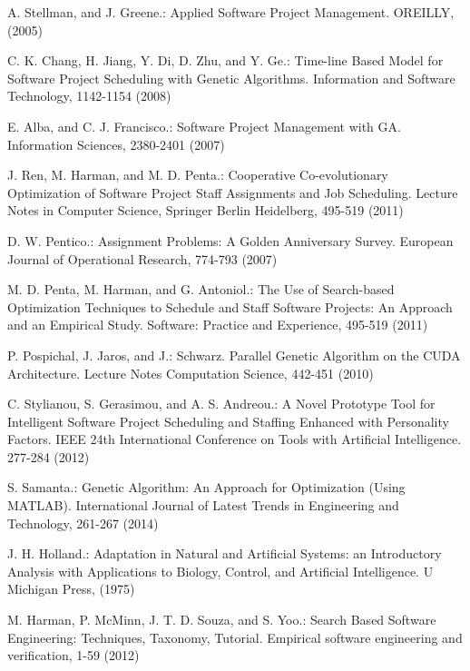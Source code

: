 %
%
\begin{thebibliography}{}
%
A. Stellman, and J. Greene.:
Applied Software Project Management.
OREILLY, (2005)

C. K. Chang, H. Jiang, Y. Di, D. Zhu, and Y. Ge.:
Time-line Based Model for Software Project 
Scheduling with Genetic Algorithms.
Information and Software Technology, 1142-1154 (2008)

E. Alba, and C. J. Francisco.:
Software Project Management with GA.
Information Sciences, 2380-2401 (2007)

J. Ren, M. Harman, and M. D. Penta.:
Cooperative Co-evolutionary Optimization of Software 
Project Staff Assignments and Job Scheduling.
Lecture Notes in Computer Science, Springer Berlin Heidelberg, 495-519 (2011)

D. W. Pentico.:
Assignment Problems: A Golden Anniversary Survey.
European Journal of Operational Research, 774-793 (2007)

M. D. Penta, M. Harman, and G. Antoniol.:
The Use of Search-based Optimization Techniques to 
Schedule and Staff Software Projects: An Approach and an Empirical Study. 
Software: Practice and Experience, 495-519 (2011)

P. Pospichal, J. Jaros, and J.:
Schwarz. Parallel Genetic Algorithm on the CUDA Architecture.
Lecture Notes Computation Science, 442-451 (2010)


C. Stylianou, S. Gerasimou, and A. S. Andreou.:
A Novel Prototype Tool for Intelligent Software 
Project Scheduling and Staffing Enhanced with Personality Factors.
IEEE 24th International Conference on Tools with Artificial Intelligence. 277-284 (2012)

S. Samanta.:
Genetic Algorithm: An Approach for Optimization (Using MATLAB). 
International Journal of Latest Trends in Engineering and Technology, 261-267 (2014)

J. H. Holland.:
Adaptation in Natural and Artificial Systems: an Introductory 
Analysis with Applications to Biology, Control, and Artificial Intelligence.
U Michigan Press, (1975)

M. Harman, P. McMinn, J. T. D. Souza, and S. Yoo.:
Search Based Software Engineering: Techniques, Taxonomy, Tutorial.
Empirical software engineering and verification, 1-59 (2012)


\end{thebibliography}
